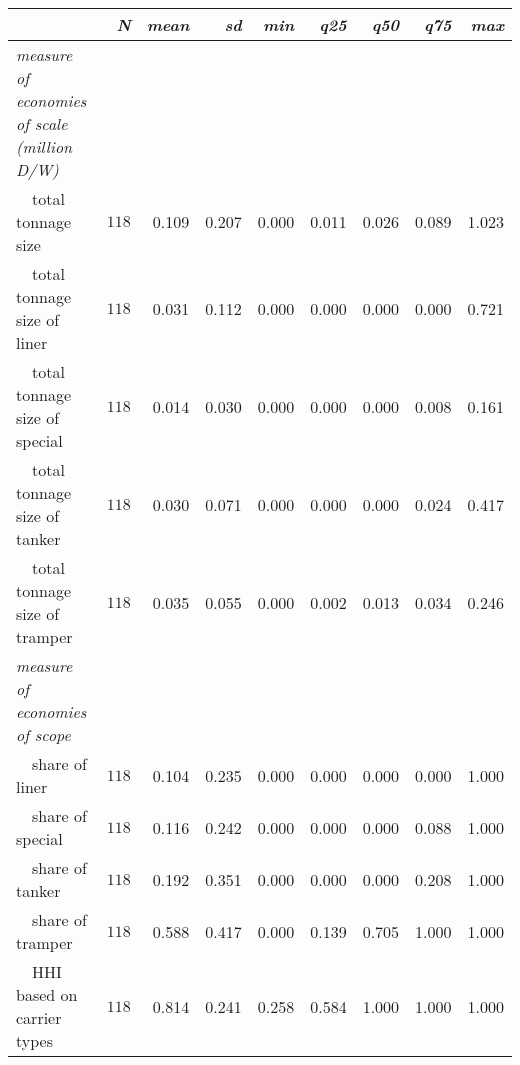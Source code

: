 \begin{tabular}{lrrrrrrrr}
\toprule
\multicolumn{1}{l}{\itshape }&\multicolumn{1}{r}{\itshape N}&\multicolumn{1}{r}{\itshape mean}&\multicolumn{1}{r}{\itshape sd}&\multicolumn{1}{r}{\itshape min}&\multicolumn{1}{r}{\itshape q25}&\multicolumn{1}{r}{\itshape q50}&\multicolumn{1}{r}{\itshape q75}&\multicolumn{1}{r}{\itshape max}\tabularnewline
\midrule
{\itshape measure of economies of scale (million D/W)}&&&&&&&&\tabularnewline
~~total tonnage size&$118$&0.109&0.207&0.000&0.011&0.026&0.089&1.023\tabularnewline
~~total tonnage size of liner&$118$&0.031&0.112&0.000&0.000&0.000&0.000&0.721\tabularnewline
~~total tonnage size of special&$118$&0.014&0.030&0.000&0.000&0.000&0.008&0.161\tabularnewline
~~total tonnage size of tanker&$118$&0.030&0.071&0.000&0.000&0.000&0.024&0.417\tabularnewline
~~total tonnage size of tramper&$118$&0.035&0.055&0.000&0.002&0.013&0.034&0.246\tabularnewline
\midrule
{\itshape measure of economies of scope}&&&&&&&&\tabularnewline
~~share of liner&$118$&0.104&0.235&0.000&0.000&0.000&0.000&1.000\tabularnewline
~~share of special&$118$&0.116&0.242&0.000&0.000&0.000&0.088&1.000\tabularnewline
~~share of tanker&$118$&0.192&0.351&0.000&0.000&0.000&0.208&1.000\tabularnewline
~~share of tramper&$118$&0.588&0.417&0.000&0.139&0.705&1.000&1.000\tabularnewline
~~HHI based on carrier types&$118$&0.814&0.241&0.258&0.584&1.000&1.000&1.000\tabularnewline
\bottomrule
\end{tabular}
